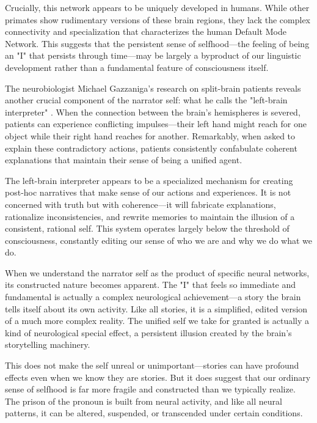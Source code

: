 Crucially, this network appears to be uniquely developed in humans. While other primates show rudimentary versions of these brain regions, they lack the complex connectivity and specialization that characterizes the human Default Mode Network. This suggests that the persistent sense of selfhood—the feeling of being an "I" that persists through time—may be largely a byproduct of our linguistic development rather than a fundamental feature of consciousness itself.

The neurobiologist Michael Gazzaniga's research on split-brain patients reveals another crucial component of the narrator self: what he calls the "left-brain interpreter" \parencite{gazzaniga2011who}. When the connection between the brain's hemispheres is severed, patients can experience conflicting impulses—their left hand might reach for one object while their right hand reaches for another. Remarkably, when asked to explain these contradictory actions, patients consistently confabulate coherent explanations that maintain their sense of being a unified agent.

The left-brain interpreter appears to be a specialized mechanism for creating post-hoc narratives that make sense of our actions and experiences. It is not concerned with truth but with coherence—it will fabricate explanations, rationalize inconsistencies, and rewrite memories to maintain the illusion of a consistent, rational self. This system operates largely below the threshold of consciousness, constantly editing our sense of who we are and why we do what we do.

When we understand the narrator self as the product of specific neural networks, its constructed nature becomes apparent. The "I" that feels so immediate and fundamental is actually a complex neurological achievement—a story the brain tells itself about its own activity. Like all stories, it is a simplified, edited version of a much more complex reality. The unified self we take for granted is actually a kind of neurological special effect, a persistent illusion created by the brain's storytelling machinery.

This does not make the self unreal or unimportant—stories can have profound effects even when we know they are stories. But it does suggest that our ordinary sense of selfhood is far more fragile and constructed than we typically realize. The prison of the pronoun is built from neural activity, and like all neural patterns, it can be altered, suspended, or transcended under certain conditions.

